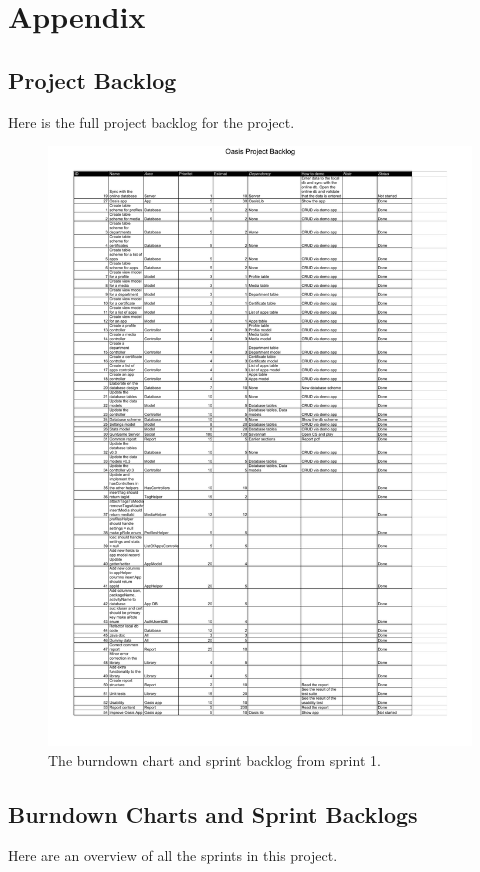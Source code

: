 \chapter*{Appendix}



\section{Project Backlog}
\label{sec:projectBacklog}
Here is the full project backlog for the project.

\begin{figure}[htbp]
	\centering
		\includegraphics[width=\textwidth]{Images/OasisProjectBacklog}
	\caption{The burndown chart and sprint backlog from sprint 1.}
	\label{fig:sprint1}
\end{figure}

\section{Burndown Charts and Sprint Backlogs}
\label{sec:burn_back}
Here are an overview of all the sprints in this project.
	

